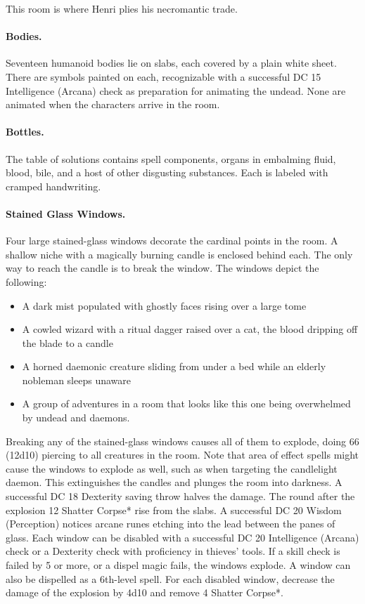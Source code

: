 \documentclass[10pt,a4paper,twoside,twocolumn,openany,bg=print,nodeprecatedcode]{dndbook}
\begin{document}
This room is where Henri plies his necromantic trade.
\paragraph{Bodies.}
Seventeen humanoid bodies lie on slabs, each covered by a plain white sheet. There are symbols painted on each, recognizable with a successful DC 15 Intelligence (Arcana) check as preparation for animating the undead. None are animated when the characters arrive in the room.
\paragraph{Bottles.}
The table of solutions contains spell components, organs in embalming fluid, blood, bile, and a host of other disgusting substances. Each is labeled with cramped handwriting.
\paragraph{Stained Glass Windows.}
Four large stained-glass windows decorate the cardinal points in the room. A shallow niche with a magically burning candle is enclosed behind each. The only way to reach the candle is to break the window. The windows depict the following:

\begin{itemize}
\item A dark mist populated with ghostly faces rising over a large tome
\item A cowled wizard with a ritual dagger raised over a cat, the blood dripping off the blade to a candle
\item A horned daemonic creature sliding from under a bed while an elderly nobleman sleeps unaware
\item A group of adventures in a room that looks like this one being overwhelmed by undead and daemons.
\end{itemize}

Breaking any of the stained-glass windows causes all of them to explode, doing 66 (12d10) piercing to all creatures in the room. Note that area of effect spells might cause the windows to explode as well, such as when targeting the candlelight daemon. This extinguishes the candles and plunges the room into darkness. A successful DC 18 Dexterity saving throw halves the damage.
The round after the explosion 12 Shatter Corpse* rise from the slabs. A successful DC 20 Wisdom (Perception) notices arcane runes etching into the lead between the panes of glass. Each window can be disabled with a successful DC 20 Intelligence (Arcana) check or a Dexterity check with proficiency in thieves' tools. If a skill check is failed by 5 or more, or a dispel magic fails, the windows explode. A window can also be dispelled as a 6th-level spell. For each disabled window, decrease the damage of the explosion by 4d10 and remove 4 Shatter Corpse*.
\end{document}
